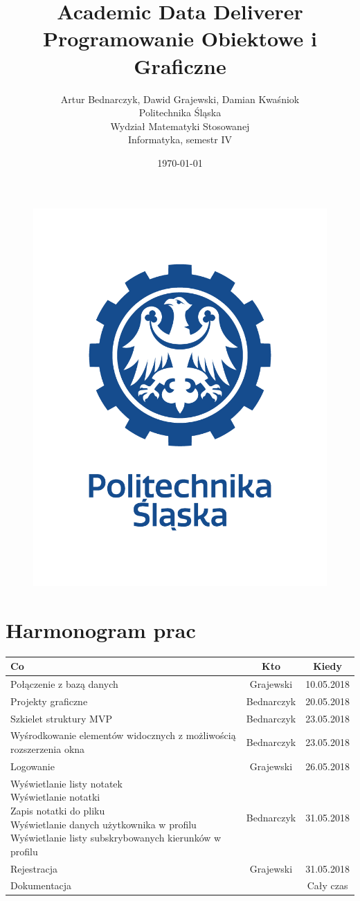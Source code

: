 \documentclass[12pt,a4paper]{article}
\title{Academic Data Deliverer\\Programowanie Obiektowe i Graficzne}
\author{Artur Bednarczyk, Dawid Grajewski, Damian Kwaśniok\\Politechnika Śląska\\Wydział Matematyki Stosowanej\\Informatyka, semestr IV}
\date{\today}
\begin{document}
	\maketitle
	\begin{figure}[H]
		\centering
		\includegraphics[width=0.5\linewidth]{LOGO2}
		\label{fig:logo}
	\end{figure}
	\clearpage
	\tableofcontents
	\clearpage
	\section{Harmonogram prac}
	\begin{tabular}{|p{}|c|c|}
	\hline
	Co & Kto & Kiedy \\	\hline\hline
	Połączenie z bazą danych & Grajewski & 10.05.2018 \\ \hline
	Projekty graficzne & Bednarczyk & 20.05.2018 \\ \hline
	Szkielet struktury MVP & Bednarczyk & 23.05.2018 \\	\hline
	Wyśrodkowanie elementów widocznych z możliwością rozszerzenia okna & Bednarczyk & 23.05.2018 \\ \hline
	Logowanie & Grajewski & 26.05.2018 \\ \hline
	\makecell[l]{Wyświetlanie listy notatek\\
	Wyświetlanie notatki\\
	Zapis notatki do pliku\\
	Wyświetlanie danych użytkownika w profilu\\
	Wyświetlanie listy subskrybowanych kierunków w profilu}& Bednarczyk & 31.05.2018 \\ \hline
	Rejestracja & Grajewski & 31.05.2018\\ \hline
	\hline
	Dokumentacja & \makecell{Bednarczyk} & Cały czas\\ \hline
	\end{tabular}
	\clearpage
\end{document}
